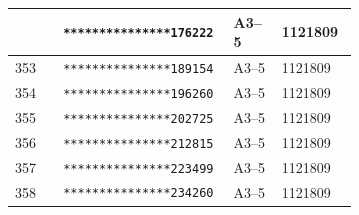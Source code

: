 \documentclass[UTF8,10pt,a4paper,fontset=fandol]{ctexart}
\newcommand{\fieldvalue}[1]{#1}
\begin{document}
\begin{center}
\begin{tabular}{|p{0.13\linewidth}|p{0.22\linewidth}|p{0.13\linewidth}|p{0.20\linewidth}|}
&
\fieldvalue{\texttt{***************176222}}
&
\fieldvalue{A3--5}
&
\fieldvalue{1121809}
&\\
\hline
\fieldvalue{353}
&
\fieldvalue{\texttt{***************189154}}
&
\fieldvalue{A3--5}
&
\fieldvalue{1121809}
&\\
\hline
\fieldvalue{354}
&
\fieldvalue{\texttt{***************196260}}
&
\fieldvalue{A3--5}
&
\fieldvalue{1121809}
&\\
\hline
\fieldvalue{355}
&
\fieldvalue{\texttt{***************202725}}
&
\fieldvalue{A3--5}
&
\fieldvalue{1121809}
&\\
\hline
\fieldvalue{356}
&
\fieldvalue{\texttt{***************212815}}
&
\fieldvalue{A3--5}
&
\fieldvalue{1121809}
&\\
\hline
\fieldvalue{357}
&
\fieldvalue{\texttt{***************223499}}
&
\fieldvalue{A3--5}
&
\fieldvalue{1121809}
&\\
\hline
\fieldvalue{358}
&
\fieldvalue{\texttt{***************234260}}
&
\fieldvalue{A3--5}
&
\fieldvalue{1121809}

\end{tabular}
\end{center}
\end{document}
